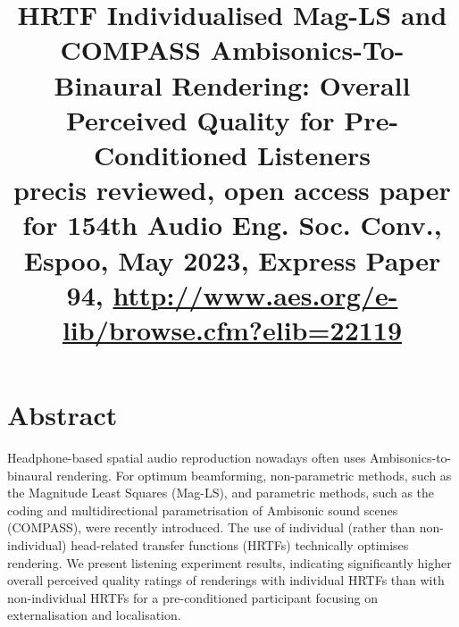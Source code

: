 \documentclass[conference]{IEEEtran}
\begin{document}
\title{HRTF Individualised Mag-LS and COMPASS Ambisonics-To-Binaural Rendering:
Overall Perceived Quality for Pre-Conditioned Listeners\\
{\footnotesize precis reviewed, open access paper for 154th
Audio Eng. Soc. Conv., Espoo, May 2023, 
Express Paper 94, \url{http://www.aes.org/e-lib/browse.cfm?elib=22119}}}
\author{
}
\maketitle
\thispagestyle{plain}
\pagestyle{plain}

\section*{Abstract}
Headphone-based spatial audio reproduction nowadays often uses Ambisonics-to-binaural rendering.
%
For optimum beamforming, non-parametric methods, such as the Magnitude Least Squares (Mag-LS), and parametric methods, such as the coding and multidirectional parametrisation of Ambisonic sound scenes (COMPASS), were recently introduced.
%
The use of individual (rather than non-individual) head-related transfer functions (HRTFs) technically optimises rendering.
%
We present listening experiment results, indicating significantly higher overall perceived quality ratings of renderings with individual HRTFs than with non-individual HRTFs for a pre-conditioned participant focusing on externalisation and localisation.
\end{document}
